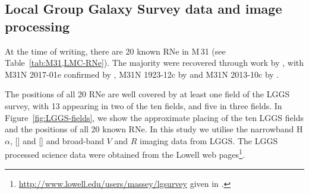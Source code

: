 \documentclass[fleqn,usenatbib]{mnras}
\begin{document}
\subsection{Local Group Galaxy Survey data and image processing}\label{LGGS data and image processing}
At the time of writing, there are 20 known RNe in M\,31 (see Table~\ref{tab:M31,LMC-RNe}). The majority were recovered through work by \citep{2015ApJS..216...34S}, with M31N 2017-01e confirmed by \citet{2017ATel10042....1W}, M31N 1923-12c by \citet{2021ATel14750....1D} and M31N 2013-10c by \citet{2023ATel16354....1S}.

The positions of all 20 RNe are well covered by at least one field of the LGGS survey, with 13 appearing in two of the ten fields, and five in three fields. In Figure~\ref{fig:LGGS-fields}, we show the approximate placing of the ten LGGS fields and the positions of all 20 known RNe. In this study we utilise the narrowband H$\alpha$, [] and [] and broad-band $V$ and $R$ imaging data from LGGS. The LGGS processed science data \citep[see][]{2006AJ....131.2478M,2007AJ....134.2474M} were obtained from the Lowell web pages\footnote{\url{http://www.lowell.edu/users/massey/lgsurvey} given in \citet{2006AJ....131.2478M}.}.
\end{document}
